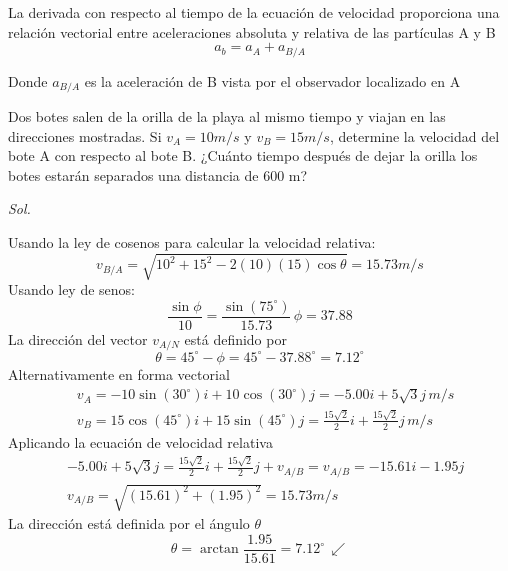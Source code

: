 \begin{definition}[Aceleración]
    La derivada con respecto al tiempo de la ecuación de
    velocidad proporciona una relación vectorial entre aceleraciones
    absoluta y relativa de las partículas A y B
    \begin{equation*}
        a_b = a_A +a_{B/A}
    \end{equation*}
\end{definition}
Donde $a_{B/A}$ es la aceleración de B vista por el observador localizado
en A

\begin{example}
    Dos botes salen de la orilla de la playa al mismo
    tiempo y viajan en las direcciones mostradas. Si $v_A=10 m/s$
    y $v_B= 15 m/s$, determine la velocidad del bote A con
    respecto al bote B. ¿Cuánto tiempo después de dejar la orilla
    los botes estarán separados una distancia de 600 m?
\end{example}

\textit{ Sol. }

Usando la ley de cosenos para calcular la velocidad relativa:
\begin{equation*}
    v_{B/A} = \sqrt{10^2+15^2-2(10)(15)\cos{\theta}}=15.73m/s
\end{equation*}
Usando ley de senos:
\begin{equation*}
    \frac{\sin{\phi}}{10}=\frac{\sin{(75^{\circ})}}{15.73}\, \phi=37.88
\end{equation*}
La dirección del vector $v_{A/N}$ está definido por
\begin{equation*}
    \theta=45^{\circ}-\phi=45^{\circ}-37.88^{\circ}=7.12^{\circ}
\end{equation*}
Alternativamente en forma vectorial
\begin{align*}
    &v_A=-10\sin{(30^{\circ})}i+10\cos{(30^{\circ})}j=-5.00i+5\sqrt{3}j\, m/s\\
    &v_B=15\cos{(45^{\circ})}i+15\sin{(45^{\circ})}j=\frac{15\sqrt{2}}{2}i+\frac{15\sqrt{2}}{2}j\, m/s
\end{align*}
Aplicando la ecuación de velocidad relativa
\begin{align*}
    &-5.00i+5\sqrt{3}j=\frac{15\sqrt{2}}{2}i+\frac{15\sqrt{2}}{2}j+v_{A/B}=v_{A/B}=-15.61i-1.95j\\
    &v_{A/B}=\sqrt{(15.61)^2+(1.95)^2}=15.73m/s
\end{align*}
La dirección está definida por el ángulo $\theta$
\begin{equation*}
    \theta=\arctan{\frac{1.95}{15.61}}=7.12^{\circ}\, \swarrow 
\end{equation*}

